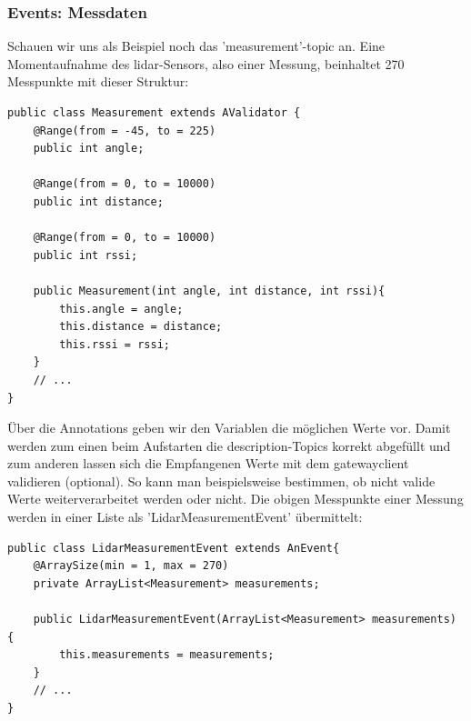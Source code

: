 \subsubsection{Events: Messdaten}
Schauen wir uns als Beispiel noch das 'measurement'-\Gls{topic} an. Eine Momentaufnahme des \acrshort{lidar}-Sensors, also einer Messung, beinhaltet 270 Messpunkte mit dieser Struktur:
\begin{lstlisting}[caption={TiM55x-Service - Struktur der Messpunkte},label={lst:tim55x-measurement}]
public class Measurement extends AValidator {
    @Range(from = -45, to = 225)
    public int angle;
    
    @Range(from = 0, to = 10000)
    public int distance;
    
    @Range(from = 0, to = 10000)
    public int rssi;

    public Measurement(int angle, int distance, int rssi){
        this.angle = angle;
        this.distance = distance;
        this.rssi = rssi;
    }
    // ...
}
\end{lstlisting}
Über die Annotations geben wir den Variablen die möglichen Werte vor. Damit werden zum einen beim Aufstarten die \Gls{description}-Topics korrekt abgefüllt und zum anderen lassen sich die Empfangenen Werte mit dem \Gls{gatewayclient} validieren (optional). So kann man beispielsweise bestimmen, ob nicht valide Werte weiterverarbeitet werden oder nicht.
Die obigen Messpunkte einer Messung werden in einer Liste als 'LidarMeasurementEvent' übermittelt:
\begin{lstlisting}[caption={TiM55x-Service - Struktur des 'LidarMeasurementEvent'},label={lst:tim55x-measurementEvent}]
public class LidarMeasurementEvent extends AnEvent{
    @ArraySize(min = 1, max = 270)
    private ArrayList<Measurement> measurements;
    
    public LidarMeasurementEvent(ArrayList<Measurement> measurements) {
        this.measurements = measurements;
    }
    // ...
}
\end{lstlisting}

